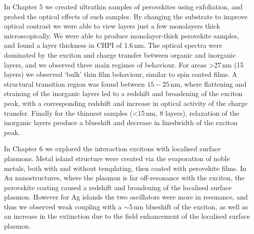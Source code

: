 In Chapter 5 we created ultrathin samples of perovskites using exfoliation, and probed the optical effects of such samples. By changing the substrate to improve optical contrast we were able to view layers just a few monolayers thick microscopically. We were able to produce monolayer-thick perovskite samples, and found a layer thickness in CHPI of 1.6\,nm. The optical spectra were dominated by the exciton and charge transfer between organic and inorganic layers, and we observed three main regimes of behaviour. For areas >27\,nm (15 layers) we observed `bulk' thin film behaviour, similar to spin coated films. A structural transition region was found between $15-25$\,nm, where flattening and straining of the inorganic layers led to a redshift and broadening of the exciton peak, with a corresponding redshift and increase in optical activity of the charge transfer. Finally for the thinnest samples (<15\,nm, 8 layers), relaxation of the inorganic layers produce a blueshift and decrease in linedwidth of the exciton peak.

In Chapter 6 we explored the interaction excitons with localised surface plasmons. Metal island structure were created via the evaporation of noble metals, both with and without templating, then coated with perovskite films. In Au nanostructures, where the plasmon is far off-resonance with the exciton, the perovskite coating caused a redshift and broadening of the localised surface plasmon. However for Ag islands the two oscillators were more in resonance, and thus we observed weak coupling with a $\sim 5$\,nm blueshift of the exciton, as well as an increase in the extinction due to the field enhancement of the localised surface plasmon.

